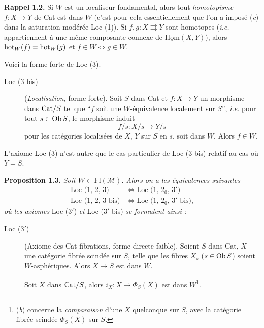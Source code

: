 \textbf{Rappel 1.2.} Si $W$ est un localiseur fondamental, alors tout \textit{homotopisme} $f : X \longrightarrow Y$ de Cat est dans $W$ (c’est pour cela essentiellement que l’on a imposé (\textit{c}) dans la saturation modérée Loc (1)). Si $f, g : X \rightrightarrows Y$ sont homotopes (\textit{i.e.} appartiennent à une même composante connexe de $\underline{\mathrm{Hom}}(X, Y)$), alors $\mathrm{hot}_W(f) = \mathrm{hot}_W(g)$ et $f \in W \iff g \in W$.

Voici la forme forte de Loc (3).

\begin{description}
\item[Loc (3 bis)] (\textit{Localisation,} forme forte). Soit $S$ dans Cat et $f : X \longrightarrow Y$ un morphisme dans $\mathrm{Cat}/S$ tel que “$f$ soit une $W$-équivalence localement sur $S$”, \textit{i.e.} pour tout $s \in \mathrm{Ob}\, S$, le morphisme induit
\[
f/s : X/s \longrightarrow Y/s
\]
pour les catégories localisées de $X$, $Y$ sur $S$ en $s$, soit dans $W$. Alors $f \in W$.
\end{description}

L’axiome Loc (3) n’est autre que le cas particulier de Loc (3 bis) relatif au cas où $Y = S$.

\textbf{Proposition 1.3.} \textit{Soit $W \subset \mathrm{Fl}(\mathcal{M})$. Alors on a les équivalences suivantes}
\[
\begin{aligned}
\text{Loc (1, 2, 3)} &\iff \text{Loc (1, $2_0$, $3'$)}\\
\text{Loc (1, 2, 3 bis)} &\iff \text{Loc (1, $2_0$, $3'$ bis),}
\end{aligned}
\]
\textit{où les axiomes} Loc ($3'$) \textit{et} Loc ($3'$ bis) \textit{se formulent ainsi :}


\begin{description}
\item[Loc (3$'$)]  (Axiome des Cat-fibrations, forme directe faible). Soient $S$ dans Cat, $X$ une catégorie fibrée scindée sur $S$, telle que les fibres $X_s$ ($s \in \mathrm{Ob}\, S$) soient $W$-asphériques. Alors $X \longrightarrow S$ est dans $W$.

 Soit $X$ dans $\mathrm{Cat}/S$, alors $i_X : X \longrightarrow \Phi_S(X)$ est dans $W$\footnote[2]{(\textit{b}) concerne la \textit{comparaison} d’une $X$ quelconque sur $S$, avec la catégorie fibrée scindée $\Phi_S(X)$ sur $S$.}. %
\end{description}


